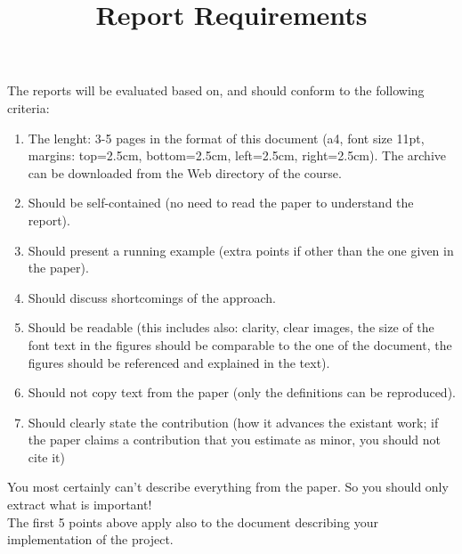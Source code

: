 \documentclass[11pt]{article}
\title{\vspace{0cm}  Report Requirements }
\date{}
\begin{document}

\pagestyle{empty}
\vspace{2cm}
\maketitle

 The reports will be evaluated based on, and should conform to the following criteria: 
\begin{enumerate}
\item The lenght: 3-5 pages in the format of this document (a4, font size 11pt,  margins:  top=2.5cm, bottom=2.5cm, left=2.5cm,  right=2.5cm). The archive can be downloaded from the Web directory of the course. 
\item Should be self-contained (no need to read the paper to understand the report). 
\item Should present a running example (extra points if other than the one given in the paper).
\item Should discuss shortcomings of the approach.
\item Should be readable (this includes also: clarity, clear images, the size of the font text in the figures should be comparable to the one of the document, the figures should be referenced and explained in the text).
\item Should not copy text from the paper (only the definitions can be reproduced). 
\item Should clearly state the contribution (how it advances the existant work; if the paper claims a contribution that you estimate as minor, you should not cite it)
\end{enumerate}

You most certainly can't describe everything from the paper. So you should only extract what is important!\\

The first 5 points above apply also to the document describing your implementation of the project.





\end{document}
